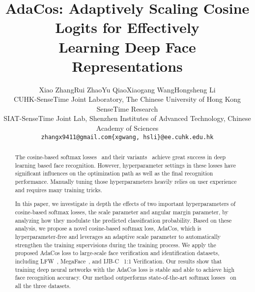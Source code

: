 \documentclass[10pt,twocolumn,letterpaper]{article}
\begin{document}
\title{AdaCos: Adaptively Scaling Cosine Logits for Effectively
\\ Learning Deep Face Representations}

\author{Xiao Zhang\quad Rui Zhao\quad Yu Qiao\quad Xiaogang Wang\quad Hongsheng Li\\
CUHK-SenseTime Joint Laboratory, The Chinese University of Hong Kong \quad
SenseTime Research \\
SIAT-SenseTime Joint Lab, Shenzhen Institutes of Advanced Technology, Chinese Academy of Sciences\\
{\tt\small zhangx9411@gmail.com\quad \{xgwang, hsli\}@ee.cuhk.edu.hk}
}

\maketitle
\thispagestyle{empty}

\begin{abstract}
The cosine-based softmax losses~\cite{liu_2017_coco_v2, L2-softmax, NormFace,gopal2014mises} and their variants~\cite{CosFace,AM-softmax,ArcFace} achieve great success in deep learning based face recognition. 
However, hyperparameter settings in these losses have significant influences on the optimization path as well as the final recognition performance. Manually tuning those hyperparameters heavily relies on user experience and requires many training tricks.  

In this paper, we investigate in depth the effects of two important hyperparameters of cosine-based softmax losses, the scale parameter and angular margin parameter, by analyzing how they modulate the predicted classification  probability. Based on these analysis, we propose a novel cosine-based softmax loss, AdaCos, which is hyperparameter-free and leverages an adaptive scale parameter to automatically strengthen the training supervisions during the training process. We apply the proposed AdaCos loss to large-scale face verification and identification datasets, including LFW~\cite{LFW}, MegaFace~\cite{MegaFace2}, and IJB-C~\cite{ijbc} 1:1 Verification. Our results show that training deep neural networks with the AdaCos loss is stable and able to achieve high face recognition accuracy. Our method outperforms state-of-the-art softmax losses~\cite{L2-softmax,CosFace,ArcFace} on all the three datasets.
\end{abstract}
\end{document}
